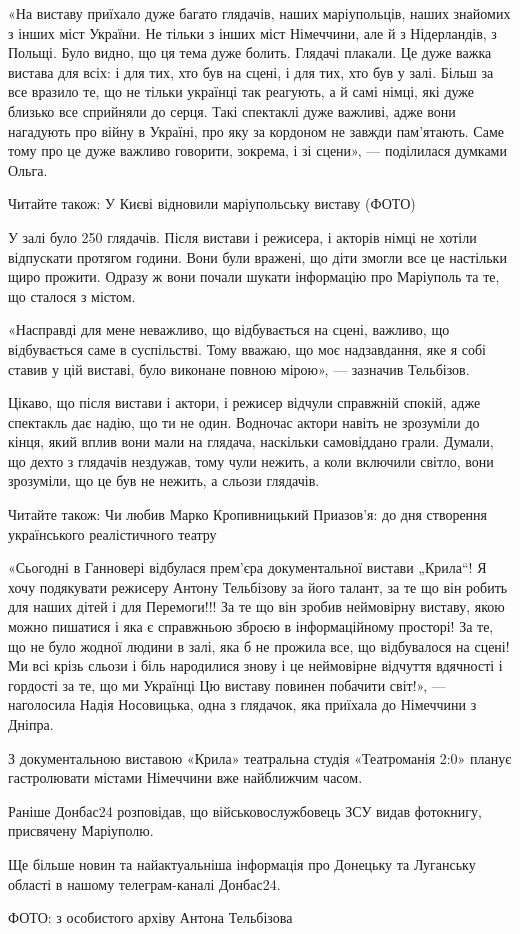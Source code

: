 «На виставу приїхало дуже багато глядачів, наших маріупольців, наших знайомих з
інших міст України. Не тільки з інших міст Німеччини, але й з Нідерландів, з
Польщі. Було видно, що ця тема дуже болить. Глядачі плакали. Це дуже важка
вистава для всіх: і для тих, хто був на сцені, і для тих, хто був у залі. Більш
за все вразило те, що не тільки українці так реагують, а й самі німці, які дуже
близько все сприйняли до серця. Такі спектаклі дуже важливі, адже вони
нагадують про війну в Україні, про яку за кордоном не завжди пам'ятають. Саме
тому про це дуже важливо говорити, зокрема, і зі сцени», — поділилася думками
Ольга.

Читайте також: У Києві відновили маріупольську виставу (ФОТО)

У залі було 250 глядачів. Після вистави і режисера, і акторів німці не хотіли
відпускати протягом години. Вони були вражені, що діти змогли все це настільки
щиро прожити. Одразу ж вони почали шукати інформацію про Маріуполь та те, що
сталося з містом.

«Насправді для мене неважливо, що відбувається на сцені, важливо, що
відбувається саме в суспільстві. Тому вважаю, що моє надзавдання, яке я собі
ставив у цій виставі, було виконане повною мірою», — зазначив Тельбізов.

Цікаво, що після вистави і актори, і режисер відчули справжній спокій, адже
спектакль дає надію, що ти не один. Водночас актори навіть не зрозуміли до
кінця, який вплив вони мали на глядача, наскільки самовіддано грали. Думали, що
дехто з глядачів нездужав, тому чули нежить, а коли включили світло, вони
зрозуміли, що це був не нежить, а сльози глядачів.

Читайте також: Чи любив Марко Кропивницький Приазов'я: до дня створення
українського реалістичного театру

«Сьогодні в Ганновері відбулася прем'єра документальної вистави „Крила“! Я хочу
подякувати режисеру Антону Тельбізову за його талант, за те що він робить для
наших дітей і для Перемоги!!! За те що він зробив неймовірну виставу, якою
можно пишатися і яка є справжньою зброєю в інформаційному просторі! За те, що
не було жодної людини в залі, яка б не прожила все, що відбувалося на сцені! Ми
всі крізь сльози і біль народилися знову і це неймовірне відчуття вдячності і
гордості за те, що ми Українці Цю виставу повинен побачити світ!», — наголосила
Надія Носовицька, одна з глядачок, яка приїхала до Німеччини з Дніпра.

З документальною виставою «Крила» театральна студія «Театроманія 2:0» планує
гастролювати містами Німеччини вже найближчим часом. 

Раніше Донбас24 розповідав, що військовослужбовець ЗСУ видав фотокнигу,
присвячену Маріуполю.

Ще більше новин та найактуальніша інформація про Донецьку та Луганську області
в нашому телеграм-каналі Донбас24.

ФОТО: з особистого архіву Антона Тельбізова
